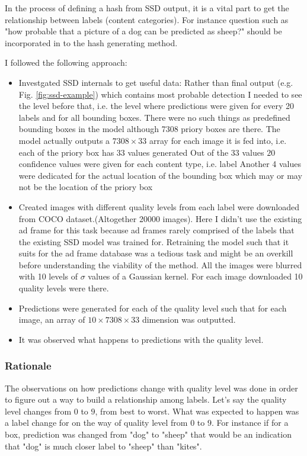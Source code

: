 In the process of defining a hash from SSD output, it is a vital part to get the relationship between labels (content categories). For instance question such as "how probable that a picture of a dog can be predicted as sheep?" should be incorporated in to the hash generating method.

I followed the following approach:
\begin{itemize}
\item Investgated SSD internals to get useful data: 
\subitem Rather than final output (e.g. Fig. \ref{fig:ssd-example}) which contains most probable detection I needed to see the level before that, i.e. the level where predictions were given for every 20 labels and for all bounding boxes.
\subitem There were no such things as predefined bounding boxes in the model although 7308 priory boxes are there. 
\subitem The model actually outputs a $7308\times 33$ array for each image it is fed into, i.e. each of the priory box has $33$ values generated
\subitem Out of the $33$ values $20$ confidence values were given for each content type, i.e. label
\subitem Another 4 values were dedicated for the actual location of the bounding box which may or may not be the location of the priory box

\item Created images with different quality levels
 from each label were downloaded from COCO dataset.(Altogether 20000 images).
\subitem Here I didn't use the existing ad frame for this task because ad frames rarely comprised of the labels that the existing SSD model was trained for. Retraining the model such that it suits for the ad frame database was a tedious task and might be an overkill before understanding the viability of the method.
\subitem All the images were blurred with 10 levels of $\sigma$ values of a Gaussian kernel.
\subitem For each image downloaded 10 quality levels were there.

\item Predictions were generated for each of the quality level such that for each image, an array of $10\times7308\times33$ dimension was outputted.

\item It was observed what happens to predictions with the quality level.
\end{itemize}

\subsubsection{Rationale}
The observations on how predictions change with quality level was done in order to figure out a way to build a relationship among labels. Let's say the quality level changes from $0$ to $9$, from best to worst. What was expected to happen was a label change for on the way of quality level from $0$ to $9$. For instance if for a box, prediction was changed from "dog" to "sheep" that would be an indication that "dog" is much closer label to "sheep" than "kites".

